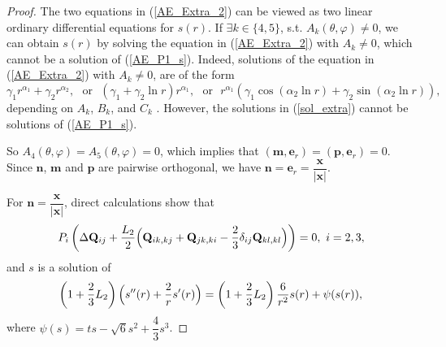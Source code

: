 \documentclass[10pt, a4paper]{article}
\newcommand\n{\mathbf{n}}
\newcommand\e{\mathbf{e}}
\newcommand\m{\mathbf{m}}
\newcommand\p{\mathbf{p}}
\newcommand\x{\mathbf{x}}
\newcommand\Qvec{\mathbf{Q}}
\begin{document}
\begin{proof}
The two equations in (\ref{AE_Extra_2}) can be viewed as two linear ordinary differential equations for $s(r)$. %
If $\exists k \in \{ 4, 5 \}$, s.t. $A_k(\theta, \varphi) \neq 0$, we can obtain $s(r)$ by solving the equation in (\ref{AE_Extra_2}) with $A_k \neq 0$, which cannot be a solution of (\ref{AE_P1_s}).
Indeed, solutions of the equation in (\ref{AE_Extra_2}) with $A_k \neq 0$, are of the form
\begin{equation}\label{sol_extra}
 \gamma_1 r^{\alpha_1} + \gamma_2 r^{\alpha_2}, ~~~\text{or}~~~  (\gamma_1 + \gamma_2 \ln r) r^{\alpha_1}, ~~~\text{or} ~~~ r^{\alpha_1}\left( \gamma_1 \cos(\alpha_2 \ln r) + \gamma_2 \sin(\alpha_2 \ln r) \right),
\end{equation} 
depending on $A_k$, $B_k$, and $C_k$ \cite{ODEBook}. However, the solutions in (\ref{sol_extra}) cannot be solutions of (\ref{AE_P1_s}). 


So $A_4(\theta, \varphi) = A_5(\theta, \varphi) = 0$, which implies that $(\m, \e_r) = (\p, \e_r) = 0$. Since $\n$, $\m$ and $\p$ are pairwise orthogonal, we have $\n = \e_r =\dfrac{\x}{|\x|}$.

For $\n = \dfrac{\x}{|\x|}$, direct calculations show that
\begin{equation}
P_i \left( \Delta \Qvec_{ij} + \frac{L_2}{2} \Bigl( \Qvec_{ik,kj} + \Qvec_{jk,ki}  - \frac{2}{3} \delta_{ij} \Qvec_{kl, kl} \Bigr) \right) = 0,~ i = 2, 3,
\end{equation} 
and $s$ is a solution of
\begin{equation}
  \left( 1 + \frac{2}{3} L_2 \right) \Bigl( s''(r) + \frac{2}{r} s'(r) \Bigr) = \left( 1 + \frac{2}{3} L_2 \right) \frac{6}{r^2} s(r) + \psi(s(r)),
\end{equation}
where $\psi(s) = ts - \sqrt{6} s^2 + \dfrac{4}{3} s^3$.


\end{proof}
\end{document}
